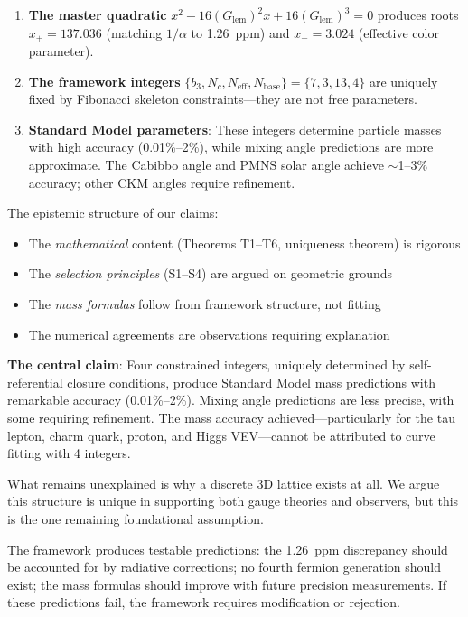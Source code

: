 \documentclass[11pt,a4paper]{article}
\theoremstyle{definition}
\theoremstyle{remark}
\newcommand{\Glem}{G_{\text{lem}}}
\newcommand{\Neff}{N_{\text{eff}}}
\begin{document}
\begin{enumerate}
    \item \textbf{The master quadratic} $x^2 - 16(\Glem)^2 x + 16(\Glem)^3 = 0$ produces roots $x_+ = 137.036$ (matching $1/\alpha$ to 1.26~ppm) and $x_- = 3.024$ (effective color parameter).

    \item \textbf{The framework integers} $\{b_3, N_c, \Neff, N_{\text{base}}\} = \{7, 3, 13, 4\}$ are uniquely fixed by Fibonacci skeleton constraints---they are not free parameters.

    \item \textbf{Standard Model parameters}: These integers determine particle masses with high accuracy (0.01\%--2\%), while mixing angle predictions are more approximate. The Cabibbo angle and PMNS solar angle achieve $\sim$1--3\% accuracy; other CKM angles require refinement.
\end{enumerate}

The epistemic structure of our claims:
\begin{itemize}
    \item The \emph{mathematical} content (Theorems T1--T6, uniqueness theorem) is rigorous
    \item The \emph{selection principles} (S1--S4) are argued on geometric grounds
    \item The \emph{mass formulas} follow from framework structure, not fitting
    \item The numerical agreements are observations requiring explanation
\end{itemize}

\textbf{The central claim}: Four constrained integers, uniquely determined by self-referential closure conditions, produce Standard Model mass predictions with remarkable accuracy (0.01\%--2\%). Mixing angle predictions are less precise, with some requiring refinement. The mass accuracy achieved---particularly for the tau lepton, charm quark, proton, and Higgs VEV---cannot be attributed to curve fitting with 4 integers.

What remains unexplained is why a discrete 3D lattice exists at all. We argue this structure is unique in supporting both gauge theories and observers, but this is the one remaining foundational assumption.

The framework produces testable predictions: the 1.26~ppm discrepancy should be accounted for by radiative corrections; no fourth fermion generation should exist; the mass formulas should improve with future precision measurements. If these predictions fail, the framework requires modification or rejection.
\end{document}
